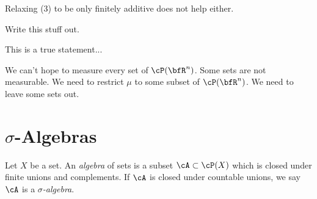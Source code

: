     Relaxing (3) to be only finitely additive does not help either. 

    \begin{theorem}
        Write this stuff out.
    \end{theorem}

    This is a true statement... 

    We can't hope to measure every set of $\cP(\bfR^n)$. Some sets are not measurable. We need to restrict $\mu$ to some subset of $\cP(\bfR^n)$. We need to leave some sets out.


\section{$\sigma$-Algebras}
    \begin{definition}
        Let $X$ be a set. An \textit{algebra} of sets is a subset $\cA \subset \cP(X)$ which is closed under finite unions and complements. If $\cA$ is closed under countable unions, we say $\cA$ is a \textit{$\sigma$-algebra}.
    \end{definition}

    
